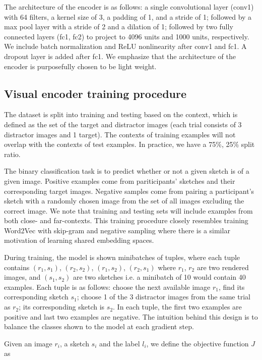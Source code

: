 \documentclass[9pt,twocolumn,twoside]{pnas-new}
\begin{document}
{The architecture of the encoder is as follows: a single convolutional layer (conv1) with 64 filters, a kernel size of 3, a padding of 1, and a stride of 1; followed by a max pool layer with a stride of 2 and a dilation of 1; followed by two fully connected layers (fc1, fc2) to project to 4096 units and 1000 units, respectively. We include batch normalization and ReLU nonlinearity after conv1 and fc1. A dropout layer is added after fc1. We emphasize that the architecture of the encoder is purposefully chosen to be light weight. 

\subsection*{Visual encoder training procedure}

The dataset is split into training and testing based on the context, which is defined as the set of the target and distractor images (each trial consists of 3 distractor images and 1 target). The contexts of training examples will not overlap with the contexts of test examples. In practice, we have a 75\%, 25\% split ratio.

The binary classification task is to predict whether or not a given sketch is of a given image. Positive examples come from pariticipants' sketches and their corresponding target images. Negative samples come from pairing a participant's sketch with a randomly chosen image from the set of all images excluding the correct image. We note that training and testing sets will include examples from both close- and far-contexts. This training procedure closely resembles training Word2Vec with skip-gram and negative sampling where there is a similar motivation of learning shared embedding spaces.

During training, the model is shown minibatches of tuples, where each tuple contains $(r_{1}, s_{1})$, $(r_{2}, s_{2})$, $(r_{1}, s_{2})$, $(r_{2}, s_{1})$ where $r_{1}$, $r_{2}$ are two rendered images, and $(s_{1}, s_{2})$ are two sketches i.e. a minibatch of 10 would contain 40 examples. Each tuple is as follows: choose the next available image $r_{1}$, find its corresponding sketch $s_{1}$; choose 1 of the 3 distractor images from the same trial as $r_{2}$; its corresponding sketch is $s_{2}$. In each tuple, the first two examples are positive and last two examples are negative. The intuition behind this design is to balance the classes shown to the model at each gradient step.

Given an image $r_{i}$, a sketch $s_{i}$ and the label $l_{i}$, we define the objective function $J$ as 

}
\end{document}
